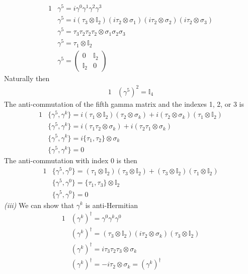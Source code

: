 \documentclass[]{article}
\numberwithin{equation}{subsection}
\begin{document}
\begin{alignat}{1}
  \label{i55} &\gamma^{5}=i\gamma^{0}\gamma^{1}\gamma^{2}\gamma^{3}\\
  \label{i56} &\gamma^{5}=i(\tau_{3}\otimes\mathbb{I}_{2})(i\tau_{2}\otimes\sigma_{1})(i\tau_{2}\otimes\sigma_{2})(i\tau_{2}\otimes\sigma_{3})\\
  \label{i57} &\gamma^{5}=\tau_{3}\tau_{2}\tau_{2}\tau_{2}\otimes\sigma_{1}\sigma_{2}\sigma_{3}\\
  \label{i58} &\gamma^{5}=\tau_{1}\otimes\mathbb{I}_{2}\\
  \label{i59} &\gamma^{5}=
  \begin{pmatrix}
    0 & \mathbb{I}_{2}\\
    \mathbb{I}_{2} & 0
  \end{pmatrix}
\end{alignat}
Naturally then
\begin{alignat}{1}
  \label{i60} &(\gamma^{5})^{2}=\mathbb{I}_{4}
\end{alignat}
The anti-commutation of the fifth gamma matrix and the indexes 1, 2, or 3 is
\begin{alignat}{1}
  \label{i61} &\{\gamma^{5},\gamma^{k}\}=i(\tau_{1}\otimes\mathbb{I}_{2})(\tau_{2}\otimes\sigma_{k})+i(\tau_{2}\otimes\sigma_{k})(\tau_{1}\otimes\mathbb{I}_{2})\\
  \label{i62} &\{\gamma^{5},\gamma^{k}\}=i(\tau_{1}\tau_{2}\otimes\sigma_{k})+i(\tau_{2}\tau_{1}\otimes\sigma_{k})\\
  \label{i63} &\{\gamma^{5},\gamma^{k}\}=i\{\tau_{1},\tau_{2}\}\otimes\sigma_{k}\\
  \label{i64} &\{\gamma^{5},\gamma^{k}\}=0
\end{alignat}
The anti-commutation with index 0 is then
\begin{alignat}{1}
  \label{i65} &\{\gamma^{5},\gamma^{0}\}=(\tau_{1}\otimes\mathbb{I}_{2})(\tau_{3}\otimes\mathbb{I}_{2})+(\tau_{3}\otimes\mathbb{I}_{2})(\tau_{1}\otimes\mathbb{I}_{2})\\
  \label{i66} &\{\gamma^{5},\gamma^{0}\}=\{\tau_{1},\tau_{3}\}\otimes\mathbb{I}_{2}\\
  \label{i67} &\{\gamma^{5},\gamma^{0}\}=0
\end{alignat}
\emph{(iii)} We can show that $\gamma^{k}$ is anti-Hermitian
\begin{alignat}{1}
  \label{i68} &(\gamma^{k})^{\dagger}=\gamma^{0}\gamma^{k}\gamma^{0}\\
  \label{i69} &(\gamma^{k})^{\dagger}=(\tau_{3}\otimes\mathbb{I}_{2})(i\tau_{2}\otimes\sigma_{k})(\tau_{3}\otimes\mathbb{I}_{2})\\
  \label{i70} &(\gamma^{k})^{\dagger}=i\tau_{3}\tau_{2}\tau_{3}\otimes\sigma_{k}\\
  \label{i71} &(\gamma^{k})^{\dagger}=-i\tau_{2}\otimes\sigma_{k}=(\gamma^{k})^{\dagger}
\end{alignat}
\end{document}
